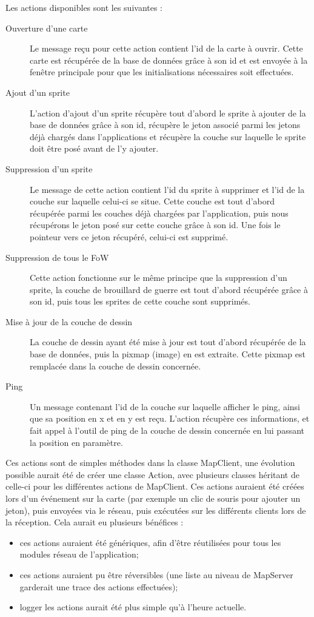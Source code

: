 Les actions disponibles sont les suivantes :
\begin{description}
	\item[Ouverture d'une carte] Le message reçu pour cette action contient l'id de la carte à ouvrir. Cette carte est récupérée de la base de données grâce à son id et est envoyée à la fenêtre principale pour que les initialisations nécessaires soit effectuées.
	\item[Ajout d'un sprite] L'action d'ajout d'un sprite récupère tout d'abord le sprite à ajouter de la base de données grâce à son id, récupère le jeton associé parmi les jetons déjà chargés dans l'applications et récupère la couche sur laquelle le sprite doit être posé avant de l'y ajouter.
	\item[Suppression d'un sprite] Le message de cette action contient l'id du sprite à supprimer et l'id de la couche sur laquelle celui-ci se situe. Cette couche est tout d'abord récupérée parmi les couches déjà chargées par l'application, puis nous récupérons le jeton posé sur cette couche grâce à son id. Une fois le pointeur vers ce jeton récupéré, celui-ci est supprimé.
	\item[Suppression de tous le FoW] Cette action fonctionne sur le même principe que la suppression d'un sprite, la couche de brouillard de guerre est tout d'abord récupérée grâce à son id, puis tous les sprites de cette couche sont supprimés.
	\item[Mise à jour de la couche de dessin] La couche de dessin ayant été mise à jour est tout d'abord récupérée de la base de données, puis la pixmap (image) en est extraite. Cette pixmap est remplacée dans la couche de dessin concernée.
	\item[Ping] Un message contenant l'id de la couche sur laquelle afficher le ping, ainsi que sa position en x et en y est reçu. L'action récupère ces informations, et fait appel à l'outil de ping de la couche de dessin concernée en lui passant la position en paramètre.
\end{description}
\bigskip

Ces actions sont de simples méthodes dans la classe MapClient, une évolution possible aurait été de créer une classe Action, avec plusieurs classes héritant de celle-ci pour les différentes actions de MapClient. Ces actions auraient été créées lors d'un événement sur la carte (par exemple un clic de souris pour ajouter un jeton), puis envoyées via le réseau, puis exécutées sur les différents clients lors de la réception. Cela aurait eu plusieurs bénéfices : 
\begin{itemize}
	\item ces actions auraient été génériques, afin d'être réutilisées pour tous les modules réseau de l'application;
	\item ces actions auraient pu être réversibles (une liste au niveau de MapServer garderait une trace des actions effectuées);
	\item logger les actions aurait été plus simple qu'à l'heure actuelle.
\end{itemize}
\bigskip

